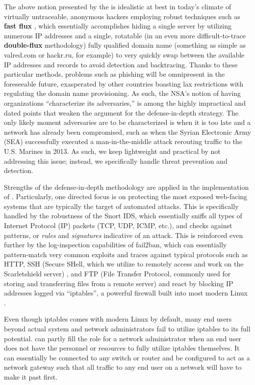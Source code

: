 \documentclass[12pt,letterpaper,titlepage]{report}
\begin{document}
{The above notion presented by the \nsa is idealistic at best in today's climate
of virtually untraceable, anonymous hackers employing robust \dns
techniques such as \textbf{fast flux} \autocite{honey}, which essentially accomplishes hiding a
single \ctwo server by utilizing numerous IP addresses and a
single, rotatable (in an even more difficult-to-trace \textbf{double-flux} methodology)
fully qualified domain name (something as simple as valred.com or hackr.ru, for
example) to very quickly swap between the available IP addresses and \dns records
to avoid detection and backtracing.  Thanks to these particular methods,
problems such as phishing will be omnipresent in the foreseeable future,
exasperated by other countries boasting lax restrictions with regulating the
domain name provisioning.  As such, the NSA’s notion of having organizations
``characterize its adversaries,'' is among the highly impractical and dated points
that weaken the argument for the defense-in-depth strategy.  The only likely
moment adversaries are to be characterized is when it is too late and a network
has already been compromised, such as when the Syrian Electronic Army (SEA)
successfully executed a man-in-the-middle attack rerouting traffic to the U.S.
Marines \autocite{syrians} in 2013.  As such, we keep \scarletshield lightweight and practical
by not addressing this issue; instead, we specifically handle threat prevention
and detection.

Strengths of the defense-in-depth methodology are applied in the implementation
of \scarletshield.  Particularly, one directed focus is on protecting the most
exposed web-facing systems that are typically the target of automated attacks.
This is specifically handled by the robustness of the Snort IDS, which
essentially sniffs all types of Internet Protocol (IP) packets (TCP, UDP, ICMP,
etc.), and checks against patterns, or \emph{rules} and \emph{signatures} indicative of an
attack.  This is reinforced even further by the log-inspection capabilities of
fail2ban, which can essentially pattern-match very common exploits and \dos
traces against typical protocols such as HTTP, SSH
(Secure SHell, which we utilize to remotely access and work on the Scarletshield server)
, and FTP 
(File Transfer Protocol, commonly used for storing and transferring files from a remote server)
and react by
blocking IP addresses logged via ``iptables'', a powerful firewall built into most
modern Linux \distros.

Even though iptables comes with modern Linux \distros by default, many end users
beyond actual system and network administrators fail to utilize iptables to its
full potential.  \scarletshield can partly fill the role for a network
administrator when an end user does not have the personnel or resources to fully
utilize iptables themselves.  It can essentially be connected to any switch or
router and be configured to act as a network gateway such that all traffic to
any end user on a network will have to make it past \scarletshield first.

}
\end{document}
